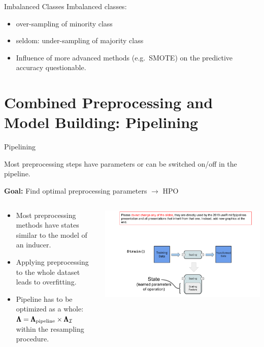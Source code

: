 \begin{frame}{Imbalanced Classes}
  Imbalanced classes:
  \begin{itemize}
    \item over-sampling of minority class
    \item seldom: under-sampling of majority class
    \item Influence of more advanced methods (e.g.\ SMOTE) on the predictive accuracy questionable.
  \end{itemize}
\end{frame}


\section{Combined Preprocessing and Model Building: Pipelining}

\begin{frame}{Pipelining}

  Most preprocessing steps have parameters or can be switched on/off in the pipeline.

  \vspace{1em}

  \textbf{Goal:} Find optimal preprocessing parameters $\rightarrow$ HPO

  \begin{columns}
    \begin{column}{0.5\textwidth}
    \begin{itemize}
      \item Most preprocessing methods have states similar to the model of an inducer.
      \item Applying preprocessing to the whole dataset leads to overfitting.
      \item Pipeline has to be optimized as a whole: $\pmb{\Lambda} = \pmb{\Lambda}_{\text{pipeline}} \times \pmb{\Lambda}_{\mathcal{I}}$ within the resampling procedure.
    \end{itemize}
    \end{column}%
    \begin{column}{0.5\textwidth}
      \begin{center}
        \includegraphics[page=19, width=\textwidth, trim=20 60 30 35, clip]{images/mlr3Pipelines_graphics}
      \end{center}
    \end{column}
  \end{columns}

\end{frame}

